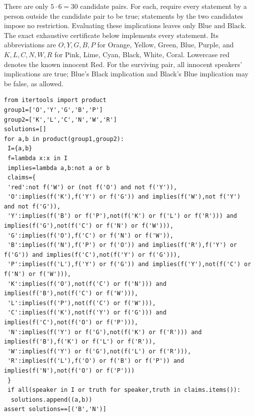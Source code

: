 There are only $5\cdot6=30$ candidate pairs. For each, require every statement by a person outside the candidate pair to be true; statements by the two candidates impose no restriction. Evaluating these implications leaves only $\boxed{\text{Blue and Black}}$. The exact exhaustive certificate below implements every statement. Its abbreviations are $O,Y,G,B,P$ for Orange, Yellow, Green, Blue, Purple, and $K,L,C,N,W,R$ for Pink, Lime, Cyan, Black, White, Coral. Lowercase red denotes the known innocent Red. For the surviving pair, all innocent speakers' implications are true; Blue's Black implication and Black's Blue implication may be false, as allowed.
\begin{verbatim}
from itertools import product
group1=['O','Y','G','B','P']
group2=['K','L','C','N','W','R']
solutions=[]
for a,b in product(group1,group2):
 I={a,b}
 f=lambda x:x in I
 implies=lambda a,b:not a or b
 claims={
 'red':not f('W') or (not f('O') and not f('Y')),
 'O':implies(f('K'),f('Y') or f('G')) and implies(f('W'),not f('Y') and not f('G')),
 'Y':implies(f('B') or f('P'),not(f('K') or f('L') or f('R'))) and implies(f('G'),not(f('C') or f('N') or f('W'))),
 'G':implies(f('O'),f('C') or f('N') or f('W')),
 'B':implies(f('N'),f('P') or f('O')) and implies(f('R'),f('Y') or f('G')) and implies(f('C'),not(f('Y') or f('G'))),
 'P':implies(f('L'),f('Y') or f('G')) and implies(f('Y'),not(f('C') or f('N') or f('W'))),
 'K':implies(f('O'),not(f('C') or f('N'))) and implies(f('B'),not(f('C') or f('W'))),
 'L':implies(f('P'),not(f('C') or f('W'))),
 'C':implies(f('K'),not(f('Y') or f('G'))) and implies(f('C'),not(f('O') or f('P'))),
 'N':implies(f('Y') or f('G'),not(f('K') or f('R'))) and implies(f('B'),f('K') or f('L') or f('R')),
 'W':implies(f('Y') or f('G'),not(f('L') or f('R'))),
 'R':implies(f('L'),f('O') or f('B') or f('P')) and implies(f('N'),not(f('O') or f('P')))
 }
 if all(speaker in I or truth for speaker,truth in claims.items()):
  solutions.append((a,b))
assert solutions==[('B','N')]
\end{verbatim}
